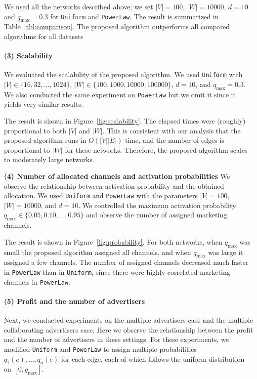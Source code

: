 \documentclass[letterpaper]{article}
\theoremstyle{definition}
\begin{document}
We used all the networks described above; we set $|V| = 100$, $|W| = 10000$, $d = 10$ and $q_{\text{max}} = 0.3$ for \texttt{Uniform} and \texttt{PowerLaw}.
The result is summarized in Table~\ref{tbl:comparison}.
The proposed algorithm outperforms all compared algorithms for all datasets


\vspace{-1.35mm}
\vspace{-1.84mm}
\paragraph{(3) Scalability}

We evaluated the scalability of the proposed algorithm.
We used \texttt{Uniform} with $|V| \in \{16, 32, \ldots, 1024\}$, $|W| \in \{100, 1000, 10000, 100000\}$, $d = 10$, and $q_{\text{max}} = 0.3$.
We also conducted the same experiment on \texttt{PowerLaw} but we omit it since it yields very similar results.

The result is shown in Figure~\ref{fig:scalability}.
The elapsed times were (roughly) proportional to both $|V|$ and $|W|$.
This is consistent with our analysis that the proposed algorithm runs in $O(|V| |E|)$ time, and the number of edges is proportional to $|W|$ for these networks.
Therefore, the proposed algorithm scales to moderately large networks.

\textbf{(4) Number of allocated channels and activation probabilities} 
We observe the relationship between activation probability and the obtained allocation.
We used \texttt{Uniform} and \texttt{PowerLaw} with the parameters $|V| = 100$,  $|W| = 10000$, and $d = 10$.
We controlled the maximum activation probability $q_{\text{max}} \in \{0.05, 0.10, \ldots, 0.95\}$ and observe the number of assigned marketing channels.

The result is shown in Figure~\ref{fig:probability}.
For both networks, when $q_{\text{max}}$ was small the proposed algorithm assigned all channels, and when $q_{\text{max}}$ was large it assigned a few channels.
The number of assigned channels decreased much faster in \texttt{PowerLaw} than in \texttt{Uniform}, since there were highly correlated marketing channels in \texttt{PowerLaw}.

\paragraph{(5) Profit and the number of advertisers}

Next, we conducted experiments on the multiple advertisers case and the multiple collaborating advertisers case.
Here we observe the relationship between the profit and the number of advertisers in these settings.
For these experiments, we modified \texttt{Uniform} and \texttt{PowerLaw}
to assign multiple probabilities $q_1(e), \ldots, q_n(e)$ for each edge, each of which follows the uniform distribution on $[0, q_{\text{max}}]$.
\end{document}
